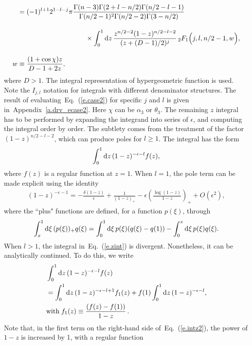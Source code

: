 \documentclass[prd,preprintnumbers,nofootinbib,superscriptaddress,onecolumn,preprint]{revtex4-1}
\newcommand\3[1]{\boldsymbol{#1}}
\newcommand{\eref}[1]{Eq.~(\ref{e.#1})}
\newcommand{\aref}[1]{Appendix~\ref{a.#1}}
\begin{document}
\begin{itemize}
\begin{align}
	&{}=(-1)^{l+1}2^{1-l-j}\pi
	\frac{\Gamma(n-3)\Gamma(2+l-n/2)\Gamma(n/2-l-1)}
	{\Gamma(n/2-1)^2\Gamma(n/2-2)\Gamma(3-n/2)}\nonumber\\[10pt]
	&\hspace{100pt} \times \int_0^1 \di{z} \frac{z^{n/2-2}(1-z)^{n/2-l-2}}{(z+(D-1)/2)^j}
	\,_2F_1\Bigl(j,l,n/2-1,w\Bigr), \label{e.case2}\\[10pt]
	w&{}\equiv\frac{(1+\cos\chi)z}{D-1+2z},
	\end{align}
	where $D>1$. The integral representation of hypergeometric function is
	used. Note the $I_{j,l}$ notation for integrals with different
	denominator structures. The result of evaluating~\eref{case2}
	for specific $j$ and $l$ is given in~\aref{drv_ecase2}.  Here $\chi$
	can be $\alpha_3$ or $\theta_3$. The remaining $z$ integral has to be
	performed by expanding the integrand into series of $\epsilon$, and
	computing the integral order by order. The subtlety comes from the
	treatment of the factor $(1-z)^{n/2-l-2}$, which can produce poles for
	$l\geq 1$. The integral has the form
	\begin{align}
	\int_0^1\di{z} (1-z)^{-\epsilon-l}f(z),
	\label{e.zint}
	\end{align}
	where $f(z)$ is a regular function at $z=1$. When $l=1$, the pole term
	can be made explicit using the identity
	\begin{align}
	(1-z)^{-\epsilon-1}=-\frac{\delta(1-z)}{\epsilon}+\frac{1}{(1-z)_+}-\epsilon\left (\frac{\log
		(1-z)}{1-z}\right )_+ + O(\epsilon^2),
	\label{e.pole_exp}
	\end{align}
	where the ``plus" functions are defined, for a function $p(\xi)$, through
	\begin{align}
	\int_x^1 \di{\xi} (p(\xi))_+ q(\xi) = \int_0^1 \di{\xi}
	p(\xi)(q(\xi)-q(1))-\int_0^x \di{\xi} p(\xi)q(\xi).
	\end{align}
	When $l>1$, the integral in~\eref{zint} is divergent.
	Nonetheless, it can be analytically continued. To do this, we write 
	\begin{align}
	&\int_0^1\di{z} (1-z)^{-\epsilon-l}f(z)\nonumber \\
	&=\int_0^1\di{z} (1-z)^{-\epsilon-l+1}f_1(z)+f(1)\int_0^1\di{z} (1-z)^{-\epsilon-l},
	\label{e.intz2} \\
	&{} \text{with} \; f_1(z)\equiv \frac{(f(z)-f(1))}{1-z} \, .
	\end{align}
	Note that, in the first term on the right-hand side of~\eref{intz2},
	the power of $1-z$ is increased by 1, with a regular function

\end{itemize}
\end{document}

